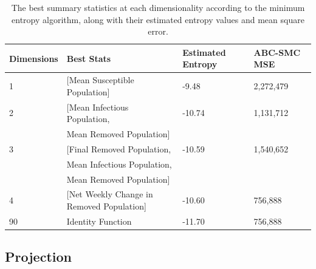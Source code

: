 \documentclass[11pt,a4paper]{article}
\theoremstyle{break}
\begin{document}
  \begin{table}[H]
    \centering
    \begin{tabular}{|l|l|l|l|}
      \hline
      \textbf{Dimensions}&\textbf{Best Stats}&\textbf{Estimated Entropy}&\textbf{ABC-SMC MSE}\\\hline
      1&[Mean Susceptible Population]&-9.48&2,272,479\\\hline
      2&[Mean Infectious Population,&-10.74&1,131,712\\
      &Mean Removed Population]&&\\\hline
      3&[Final Removed Population,&-10.59&1,540,652\\
      &Mean Infectious Population,&&\\
      &Mean Removed Population]&&\\\hline
      4&[Net Weekly Change in Removed Population]&-10.60&756,888\\\hline
      90&Identity Function&-11.70&756,888\\\hline
    \end{tabular}
    \caption{The best summary statistics at each dimensionality according to the minimum entropy algorithm, along with their estimated entropy values and mean square error.}
    \label{table_dimensionality_of_summary_statistics}
  \end{table}

\subsection{Projection}\label{sec_projection}
\end{document}
